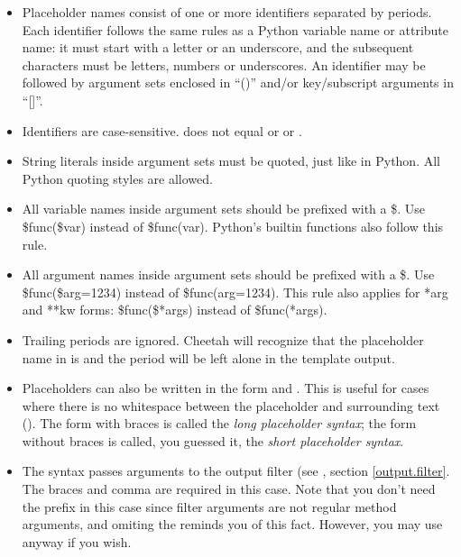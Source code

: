 \begin{itemize} 
     
\item Placeholder names consist of one or more identifiers separated by periods.
     Each identifier follows the same rules as a Python variable name or
     attribute name: it must start with a letter or an underscore, and the
     subsequent characters must be letters, numbers or underscores.  An
     identifier may be followed by argument sets enclosed in ``()'' and/or
     key/subscript arguments in ``[]''.

\item Identifiers are case-sensitive.  does not equal 
     or  or .     
     
\item String literals inside argument sets must be quoted, just like in Python.
     All Python quoting styles are allowed.
     
\item All variable names inside argument sets should be prefixed with a \$.
     Use \$func(\$var) instead of \$func(var).  Python's builtin functions also
     follow this rule.

\item All argument names inside argument sets should be prefixed with a \$.
     Use \$func(\$arg=1234) instead of \$func(arg=1234).  This rule also applies
     for *arg and **kw forms: \$func(\$*args) instead of \$func(*args).
    
\item Trailing periods are ignored.  Cheetah will recognize that the placeholder
     name in  is  and the period will be left
     alone in the template output.
     
\item Placeholders can also be written in the form 
     and .  This is useful for cases where there is no
     whitespace between the placeholder and surrounding text
     ().  The form with braces is called
     the {\em long placeholder syntax}; the form without braces is called, you
     guessed it, the {\em short placeholder syntax}.

\item The syntax  passes arguments to
     the output filter (see , section \ref{output.filter}.
     The braces and comma are required in this case.  Note that you don't need
     the \code{\$} prefix in this case since filter arguments are not regular
     method arguments, and omiting the \code{\$} reminds you of this fact.
     However, you may use \code{\$} anyway if you wish.


\end{itemize}
